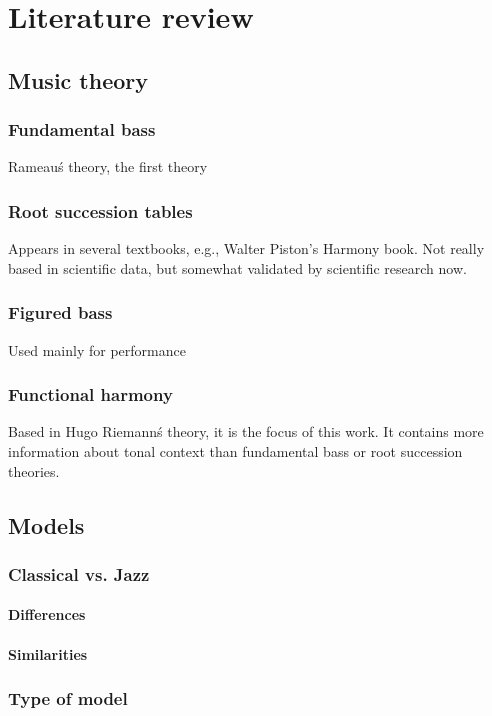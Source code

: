 \normallinespacing

\chapter{Literature review}

\section{Music theory}
  \subsection{Fundamental bass}
  Rameau\'s theory, the first theory
  \subsection{Root succession tables}
  Appears in several textbooks, e.g., Walter Piston's Harmony book. Not really based in scientific data, but somewhat validated by scientific research now.
  \subsection{Figured bass}
  Used mainly for performance
  \subsection{Functional harmony}
  Based in Hugo Riemann\'s theory, it is the focus of this work. It contains more information about tonal context than fundamental bass or root succession theories.

\section{Models}
  \subsection{Classical vs. Jazz}
    \subsubsection{Differences}
    \subsubsection{Similarities}
  \subsection{Type of model}
